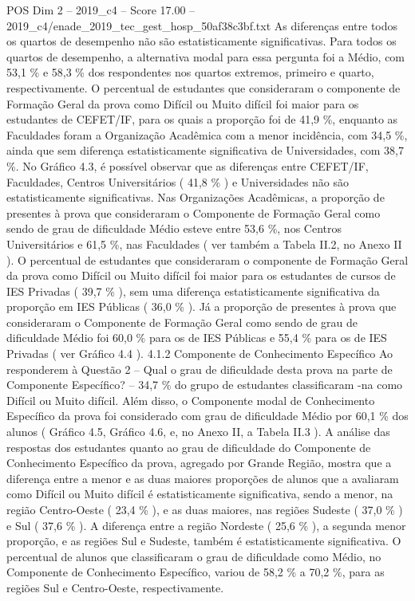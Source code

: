 \begin{textsample}{POS Dim 2 – 2019\_c4 – Score 17.00 – 2019\_c4/enade\_2019\_tec\_gest\_hosp\_50af38c3bf.txt}
As diferenças entre todos os quartos de desempenho não são estatisticamente significativas.
Para todos os quartos de desempenho, a alternativa modal para essa pergunta foi a Médio, com 53,1 \% e 58,3 \% dos respondentes nos quartos extremos, primeiro e quarto, respectivamente.
O percentual de estudantes que consideraram o componente de Formação Geral da prova como Difícil ou Muito difícil foi maior para os estudantes de CEFET/IF, para os quais a proporção foi de 41,9 \%, enquanto as Faculdades foram a Organização Acadêmica com a menor incidência, com 34,5 \%, ainda que sem diferença estatisticamente significativa de Universidades, com 38,7 \%.
No Gráfico 4.3, é possível observar que as diferenças entre CEFET/IF, Faculdades, Centros Universitários ( 41,8 \% ) e Universidades não são estatisticamente significativas.
Nas Organizações Acadêmicas, a proporção de presentes à prova que consideraram o Componente de Formação Geral como sendo de grau de dificuldade Médio esteve entre 53,6 \%, nos Centros Universitários e 61,5 \%, nas Faculdades ( ver também a Tabela II.2, no Anexo II ).
O percentual de estudantes que consideraram o componente de Formação Geral da prova como Difícil ou Muito difícil foi maior para os estudantes de cursos de IES Privadas ( 39,7 \% ), sem uma diferença estatisticamente significativa da proporção em IES Públicas ( 36,0 \% ).
Já a proporção de presentes à prova que consideraram o Componente de Formação Geral como sendo de grau de dificuldade Médio foi 60,0 \% para os de IES Públicas e 55,4 \% para os de IES Privadas ( ver Gráfico 4.4 ). 4.1.2 Componente de Conhecimento Específico Ao responderem à Questão 2 – Qual o grau de dificuldade desta prova na parte de Componente Específico? – 34,7 \% do grupo de estudantes classificaram -na como Difícil ou Muito difícil.
Além disso, o Componente modal de Conhecimento Específico da prova foi considerado com grau de dificuldade Médio por 60,1 \% dos alunos ( Gráfico 4.5, Gráfico 4.6, e, no Anexo II, a Tabela II.3 ).
A análise das respostas dos estudantes quanto ao grau de dificuldade do Componente de Conhecimento Específico da prova, agregado por Grande Região, mostra que a diferença entre a menor e as duas maiores proporções de alunos que a avaliaram como Difícil ou Muito difícil é estatisticamente significativa, sendo a menor, na região Centro-Oeste ( 23,4 \% ), e as duas maiores, nas regiões Sudeste ( 37,0 \% ) e Sul ( 37,6 \% ).
A diferença entre a região Nordeste ( 25,6 \% ), a segunda menor proporção, e as regiões Sul e Sudeste, também é estatisticamente significativa.
O percentual de alunos que classificaram o grau de dificuldade como Médio, no Componente de Conhecimento Específico, variou de 58,2 \% a 70,2 \%, para as regiões Sul e Centro-Oeste, respectivamente.

\end{textsample}
